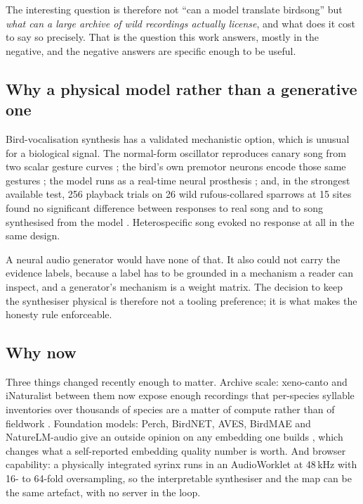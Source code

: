 \documentclass[10pt,twocolumn,a4paper]{article}
\begin{document}
The interesting question is therefore not ``can a model translate birdsong'' but
\emph{what can a large archive of wild recordings actually license}, and what does it cost
to say so precisely. That is the question this work answers, mostly in the negative, and
the negative answers are specific enough to be useful.

\subsection*{Why a physical model rather than a generative one}

Bird-vocalisation synthesis has a validated mechanistic option, which is unusual for a
biological signal. The normal-form oscillator reproduces canary song from two scalar
gesture curves \citep{gardner2001}; the bird's own premotor neurons encode those same
gestures \citep{amador2013}; the model runs as a real-time neural
prosthesis \citep{arneodo2012}; and, in the strongest available test, 256 playback trials
on 26 wild rufous-collared sparrows at 15 sites found no significant difference between
responses to real song and to song synthesised from the
model \citep{bistel2024}. Heterospecific song evoked no response at all in the same
design.

A neural audio generator would have none of that. It also could not carry the evidence
labels, because a label has to be grounded in a mechanism a reader can inspect, and a
generator's mechanism is a weight matrix. The decision to keep the synthesiser physical is
therefore not a tooling preference; it is what makes the honesty rule enforceable.

\subsection*{Why now}

Three things changed recently enough to matter. Archive scale: xeno-canto and iNaturalist
between them now expose enough recordings that per-species syllable inventories over
thousands of species are a matter of compute rather than of
fieldwork \citep{xenocanto,inatsounds2024}. Foundation models: Perch, BirdNET, AVES, BirdMAE
and NatureLM-audio give an outside opinion on any embedding one
builds \citep{perch2,birdnet2021,aves2022,birdmae2025,naturelm2024}, which changes
what a self-reported embedding quality number is worth. And browser capability: a
physically integrated syrinx runs in an AudioWorklet at 48\,kHz with 16- to 64-fold
oversampling, so the interpretable synthesiser and the map can be the same artefact,
with no server in the loop.
\end{document}
